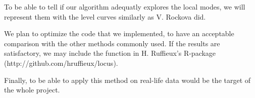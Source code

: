 \documentclass[a4paper, 11pt]{report}
\numberwithin{equation}{chapter}
\begin{document}
To be able to tell if our algorithm adequatly explores the local modes, we will represent them with the level curves similarly as V. Rockova \cite{rockova} did.

We plan to optimize the code that we implemented, to have an acceptable comparison with the other methods commonly used. If the results are satisfactory, we may include the function in H. Ruffieux's R-package (http://github.com/hruffieux/locus).

Finally, to be able to apply this method on real-life data would be the target of the whole project.
\newpage


\end{document}
